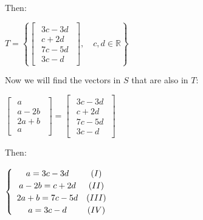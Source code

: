 \singlespacing

Then:

\singlespacing

\begin{math}
    T=\left\{
    \begin{bmatrix}
        \begin{array}{c}
            3c-3d \\
            c+2d  \\
            7c-5d \\
            3c-d
        \end{array}
    \end{bmatrix},\quad c,d \in \mathbb{R}\right\}
\end{math}

\singlespacing
\singlespacing

Now we will find the vectors in $S$ that are also in $T$:

\singlespacing

\begin{math}
    \begin{bmatrix}
        \begin{array}{c}
            a    \\
            a-2b \\
            2a+b \\
            a
        \end{array}
    \end{bmatrix}
    =
    \begin{bmatrix}
        \begin{array}{c}
            3c-3d \\
            c+2d  \\
            7c-5d \\
            3c-d
        \end{array}
    \end{bmatrix}
\end{math}

\singlespacing

Then:

\singlespacing

\begin{math}
    \begin{cases}
        \begin{array}{cc}
            a=3c-3d    & (\rom{1}) \\
            a-2b=c+2d  & (\rom{2}) \\
            2a+b=7c-5d & (\rom{3}) \\
            a=3c-d     & (\rom{4})
        \end{array}
    \end{cases}
\end{math}

